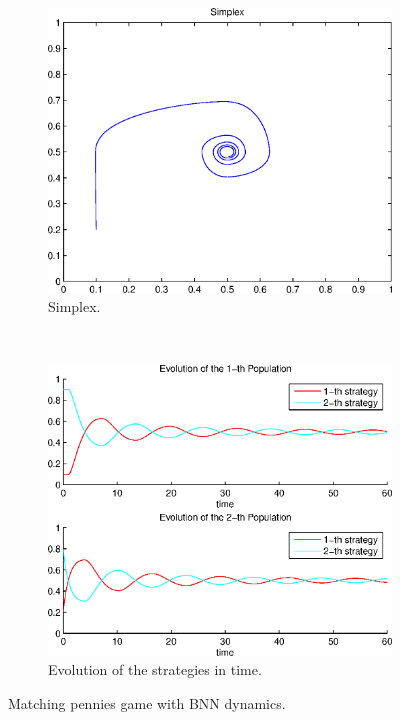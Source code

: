 \begin{figure}[h]
  \centering
  \begin{subfigure}[b]{0.45\textwidth}
	  \includegraphics[width=\textwidth]{./images/test2_simplex_bnn.eps}
	  \caption{Simplex.}
	  \label{fig:test2_simplex_bnn}
  \end{subfigure}
  ~ 
  \begin{subfigure}[b]{0.45\textwidth}
	  \includegraphics[width=\textwidth]{./images/test2_ev_bnn.eps}
	  \caption{Evolution of the strategies in time.}
	  \label{fig:test2_ev_bnn}
  \end{subfigure}
  \caption{Matching pennies game with BNN dynamics.}
  \label{fig:mp_game_bnn}
\end{figure}



